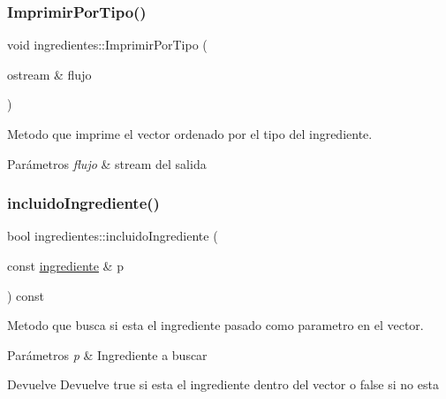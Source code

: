 \subsubsection{\texorpdfstring{Imprimir\+Por\+Tipo()}{ImprimirPorTipo()}}
{\footnotesize\ttfamily void ingredientes\+::\+Imprimir\+Por\+Tipo (\begin{DoxyParamCaption}\item[{ostream \&}]{flujo }\end{DoxyParamCaption})}



Metodo que imprime el vector ordenado por el tipo del ingrediente. 


\begin{DoxyParams}{Parámetros}
{\em flujo} & stream del salida \\
\hline
\end{DoxyParams}
\mbox{\label{classingredientes_a6d3f30e2e79299a970c705f61a8ee4d7}} 
\subsubsection{\texorpdfstring{incluido\+Ingrediente()}{incluidoIngrediente()}}
{\footnotesize\ttfamily bool ingredientes\+::incluido\+Ingrediente (\begin{DoxyParamCaption}\item[{const \hyperlink{classingrediente}{ingrediente} \&}]{p }\end{DoxyParamCaption}) const}



Metodo que busca si esta el ingrediente pasado como parametro en el vector. 


\begin{DoxyParams}{Parámetros}
{\em p} & Ingrediente a buscar \\
\hline
\end{DoxyParams}
\begin{DoxyReturn}{Devuelve}
Devuelve true si esta el ingrediente dentro del vector o false si no esta 
\end{DoxyReturn}
\mbox{\label{classingredientes_a7633d03cdda31180994b63090ff9dd11}} 
